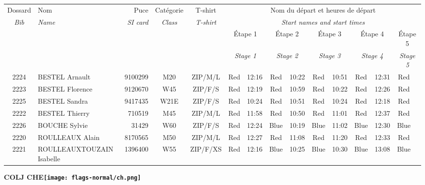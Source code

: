 \documentclass{report}
\begin{document}
  \begin{longtable}{|c|l|r|c|c|*{5}{cc|}}
    Dossard & Nom  & Puce    & Catégorie & T-shirt & \multicolumn{10}{c|}{Nom du départ et heures de départ} \\
    \itshape Bib     & \itshape Name & \itshape SI card & \itshape Class  & \itshape  T-shirt  & \multicolumn{10}{c|}{\itshape Start names and start times} \\
    \hline
    & & & & & \multicolumn{2}{c|}{Étape 1} & \multicolumn{2}{c|}{Étape 2} & \multicolumn{2}{c|}{Étape 3} & \multicolumn{2}{c|}{Étape 4} & \multicolumn{2}{c|}{Étape 5} \\
    & & & & & \multicolumn{2}{c|}{\itshape Stage 1} & \multicolumn{2}{c|}{\itshape Stage 2} & \multicolumn{2}{c|}{\itshape Stage 3} & \multicolumn{2}{c|}{\itshape Stage 4} & \multicolumn{2}{c|}{\itshape Stage 5} \\
    \hline
    2224 & BESTEL Arnault & 9100299 & M20 & ZIP/M/L & Red & 12:16 & Red & 10:22 & Red & 10:51 & Red & 12:31 & Red &  \\
    2223 & BESTEL Florence & 9120670 & W45 & ZIP/F/S & Red & 12:19 & Red & 10:59 & Red & 10:22 & Red & 12:26 & Red &  \\
    2225 & BESTEL Sandra & 9417435 & W21E & ZIP/F/S & Red & 10:24 & Red & 10:51 & Red & 10:24 & Red & 12:18 & Red &  \\
    2222 & BESTEL Thierry & 710519 & M45 & ZIP/M/L & Red & 11:58 & Red & 10:50 & Red & 11:01 & Red & 12:37 & Red &  \\
    2226 & BOUCHE Sylvie & 31429 & W60 & ZIP/F/S & Red & 12:24 & Blue & 10:19 & Blue & 11:02 & Blue & 12:30 & Blue &  \\
    2220 & ROULLEAUX Alain & 8170565 & M50 & ZIP/M/L & Red & 12:27 & Red & 11:08 & Red & 11:20 & Red & 12:33 & Red &  \\
    2221 & ROULLEAUXTOUZAIN Isabelle & 1396400 & W55 & ZIP/F/XS & Red & 12:16 & Blue & 10:25 & Blue & 10:30 & Blue & 13:08 & Blue &  \\
  \end{longtable}
\newpage
  \Huge \centering \bfseries COLJ  CHE\normalfont \footnotesize \sffamily \hfill \texttt{[image: flags-normal/ch.png]} \newline 
\end{document}
